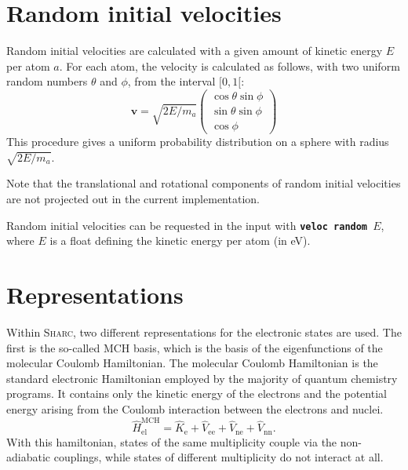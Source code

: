\documentclass[a4paper,11pt,DIV=15,openany,twoside=false]{scrbook}
\newcommand{\sharc}{\textsc{Sharc}}
\newcommand{\ttt}[1]{\textbf{\texttt{#1}}}
\newcommand{\VEC}[1]{\ensuremath{\mathbf{#1}}}
\begin{document}
\section{Random initial velocities}\label{met:veloc}

Random initial velocities are calculated with a given amount of kinetic energy $E$ per atom $a$. For each atom, the velocity is calculated as follows, with two uniform random numbers $\theta$ and $\phi$, from the interval $[0,1[$:
\begin{equation}
  \VEC{v}=\sqrt{2E/m_a}
  \begin{pmatrix}
    \cos{\theta}\sin{\phi}\\
    \sin{\theta}\sin{\phi}\\
    \cos{\phi}
  \end{pmatrix}
\end{equation}
This procedure gives a uniform probability distribution on a sphere with radius $\sqrt{2E/m_a}$.

Note that the translational and rotational components of random initial velocities are not projected out in the current implementation.

Random initial velocities can be requested in the input with \ttt{veloc random $E$}, where $E$ is a float defining the kinetic energy per atom (in eV).


\section{Representations}\label{sec:repr}

Within \sharc, two different representations for the electronic states are used. The first is the so-called MCH basis, which is the basis of the eigenfunctions of the molecular Coulomb Hamiltonian. The molecular Coulomb Hamiltonian is the standard electronic Hamiltonian employed by the majority of quantum chemistry programs. It contains only the kinetic energy of the electrons and the potential energy arising from the Coulomb interaction between the electrons and nuclei.
\begin{equation}
  \hat{H}_{\text{el}}^{\text{MCH}}
  =\hat{K}_{\text{e}}
  +\hat{V}_{\text{ee}}
  +\hat{V}_{\text{ne}}
  +\hat{V}_{\text{nn}}.
\end{equation}
With this hamiltonian, states of the same multiplicity couple via the non-adiabatic couplings, while states of different multiplicity do not interact at all. 
\end{document}
